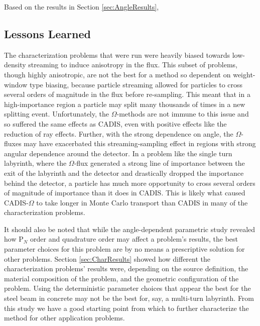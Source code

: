 Based on the results in Section \ref{sec:AngleResults},



\subsection{Lessons Learned}
\label{sec:lesslearn}

The characterization problems that were run were heavily biased towards
low-density streaming to induce anisotropy in the flux. This subset of
problems, though highly anisotropic, are not the best
for a method so dependent on weight-window type biasing,
because particle streaming allowed for particles to cross several orders of
magnitude in the flux before re-sampling. This meant that in a high-importance
region a particle may split many thousands of times in a new splitting event.
Unfortunately, the $\Omega$-methods are not immune to this issue and so suffered
the same effects as CADIS, even with positive effects like the reduction of ray
effects. Further, with the strong dependence on angle, the $\Omega$-fluxes may
have exacerbated this streaming-sampling effect in regions with strong angular
dependence around the detector. In a problem like the single turn labyrinth,
where the $\Omega$-flux generated a strong line of importance between the exit
of the labyrinth and the detector and drastically dropped the importance behind
the detector, a particle has much more opportunity to cross several orders of
magnitude of importance than it does in CADIS. This is likely what caused
CADIS-$\Omega$ to take longer in Monte Carlo transport than CADIS in many of the
characterization problems.

It should also be noted that while the angle-dependent parametric study revealed
how P$_N$ order and quadrature order may affect a problem's results, the
best parameter choices for this problem are by no means a prescriptive solution
for other problems. Section \ref{sec:CharResults}
showed how different the characterization problems' results were, depending on
the source definition, the material composition of the problem, and the
geometric configuration of the problem. Using the deterministic parameter
choices that appear the best for the steel beam in concrete may not be the best
for, say, a multi-turn labyrinth. From this study we have a good starting point
from which to further characterize the method for other application problems.


